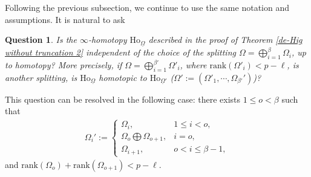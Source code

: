 \documentclass[12pt, a4paper]{article}
\newtheorem{question}{Question}[section]
\begin{document}
Following the previous subsection, we continue to use the same notation and assumptions. It is natural to ask 
\begin{question}
Is the $\infty$-homotopy $\mathrm{Ho}_{\underline\Omega}$ described in the proof of Theorem \ref{de-Hig without truncation 2} independent of the choice of the splitting $\Omega=\bigoplus_{i=1}^\beta\Omega_i$, up to homotopy? More precisely, if $\Omega=\bigoplus_{i=1}^{\beta'} \Omega'_i$, where $\mathrm{rank}(\Omega'_i)<p-\ell$, is another splitting, is $\mathrm{Ho}_{\underline\Omega}$ homotopic to $\mathrm{Ho}_{\underline\Omega'}$ ($\Omega':=(\Omega'_1,\cdots,\Omega_{\beta'}')$)?
\end{question}
This question can be resolved in the following case: there exists $1\leq o<\beta$ such that
\begin{eqnarray}\label{case i}
\Omega_i':=\left\{
\begin{matrix}
 \Omega_i,&1\leq i<o,\\
 \Omega_o\bigoplus\Omega_{o+1},&i=o,\\
 \Omega_{i+1},&o<i\leq\beta-1,
\end{matrix}
\right.
\end{eqnarray}
and $\mathrm{rank}(\Omega_o)+\mathrm{rank}(\Omega_{o+1})<p-\ell$.

\end{document}
